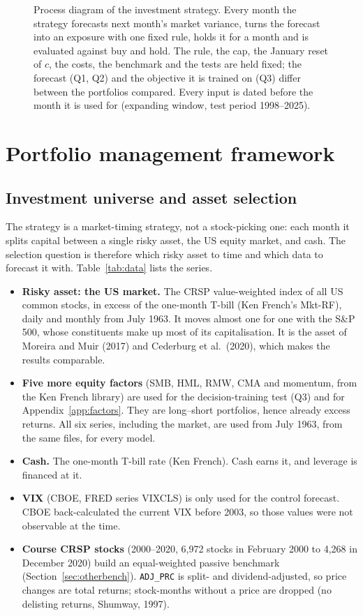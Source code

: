 \documentclass[12pt]{article}
\begin{document}
\begin{figure}[p]
\centering

\caption{Process diagram of the investment strategy. Every month the strategy forecasts next month's market variance, turns the forecast into an exposure with one fixed rule, holds it for a month and is evaluated against buy and hold. The rule, the cap, the January reset of $c$, the costs, the benchmark and the tests are held fixed; the forecast (Q1, Q2) and the objective it is trained on (Q3) differ between the portfolios compared. Every input is dated before the month it is used for (expanding window, test period 1998--2025).}
\label{fig:process}
\end{figure}

\section{Portfolio management framework}
\subsection{Investment universe and asset selection}
The strategy is a market-timing strategy, not a stock-picking one: each month it splits capital between a single risky asset, the US equity market, and cash. The selection question is therefore which risky asset to time and which data to forecast it with. Table~\ref{tab:data} lists the series.
\begin{itemize}
\item \textbf{Risky asset: the US market.} The CRSP value-weighted index of all US common stocks, in excess of the one-month T-bill (Ken French's Mkt-RF), daily and monthly from July 1963. It moves almost one for one with the S\&P 500, whose constituents make up most of its capitalisation. It is the asset of Moreira and Muir (2017) and Cederburg et al.\ (2020), which makes the results comparable.
\item \textbf{Five more equity factors} (SMB, HML, RMW, CMA and momentum, from the Ken French library) are used for the decision-training test (Q3) and for Appendix~\ref{app:factors}. They are long--short portfolios, hence already excess returns. All six series, including the market, are used from July 1963, from the same files, for every model.
\item \textbf{Cash.} The one-month T-bill rate (Ken French). Cash earns it, and leverage is financed at it.
\item \textbf{VIX} (CBOE, FRED series VIXCLS) is only used for the \VIX{} control forecast. CBOE back-calculated the current VIX before 2003, so those values were not observable at the time.
\item \textbf{Course CRSP stocks} (2000--2020, 6,972 stocks in February 2000 to 4,268 in December 2020) build an equal-weighted passive benchmark (Section~\ref{sec:otherbench}). \texttt{ADJ\_PRC} is split- and dividend-adjusted, so price changes are total returns; stock-months without a price are dropped (no delisting returns, Shumway, 1997).
\end{itemize}
\end{document}
